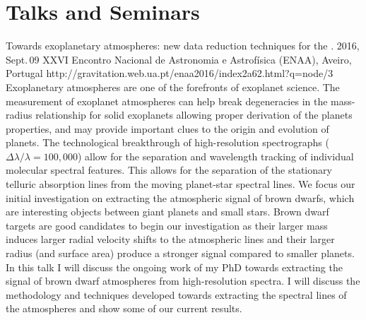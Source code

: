 \section{Talks and Seminars}\label{app_sec:talks}

{Towards exoplanetary atmospheres: new data reduction techniques for the \nir{}.} %
{2016, Sept.\,09}%
{XXVI Encontro Nacional de Astronomia e Astrofísica (ENAA), Aveiro, Portugal}%
{http://gravitation.web.ua.pt/enaa2016/index2a62.html?q=node/3}%
{}%
{Exoplanetary atmospheres are one of the forefronts of exoplanet science.
The measurement of exoplanet atmospheres can help break degeneracies in the mass-radius relationship for solid exoplanets allowing proper derivation of the planets properties, and may provide important clues to the origin and evolution of planets.
The technological breakthrough of high-resolution spectrographs ($\Delta \lambda / \lambda = 100,000$) allow for the separation and wavelength tracking of individual molecular spectral features.
This allows for the separation of the stationary telluric absorption lines from the moving planet-star spectral lines.
We focus our initial investigation on extracting the atmospheric signal of brown dwarfs, which are interesting objects between giant planets and small stars.
Brown dwarf targets are good candidates to begin our investigation as their larger mass induces larger radial velocity shifts to the atmospheric lines and their larger radius (and surface area) produce a stronger signal compared to smaller planets.
In this talk I will discuss the ongoing work of my PhD towards extracting the signal of brown dwarf atmospheres from high-resolution \nir{}spectra.
I will discuss the methodology and techniques developed towards extracting the spectral lines of the atmospheres and show some of our current results.}%


